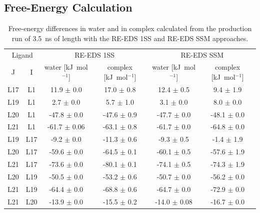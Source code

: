 \subsection{Free-Energy Calculation}
\begin{table}[H]
\caption{Free-energy differences in water and in complex calculated from the production run of 3.5~ns of length with the RE-EDS 1SS and RE-EDS SSM approaches.}
\begin{center}
\begin{tabular}{ c c |c c |c c}
  \multicolumn{2}{c|}{Ligand} & \multicolumn{2}{c|}{RE-EDS 1SS} &\multicolumn{2}{c}{RE-EDS SSM}\\ 
  J & I  & water [kJ~mol$^{-1}$] & complex [kJ~mol$^{-1}$]  & water [kJ~mol$^{-1}$] & complex [kJ~mol$^{-1}$] \\
  \hline
        L17 &         L1 &       11.9 $\pm$ 0.0&        17.0 $\pm$ 0.8&   12.4 $\pm$ 0.5&   9.4 $\pm$ 1.9\\
        L19 &         L1 &        2.7 $\pm$ 0.0&        5.7 $\pm$ 1.0&     3.1 $\pm$ 0.0&   8.0 $\pm$ 0.0\\
        L20 &         L1 &      -47.8 $\pm$ 0.0&      -47.6 $\pm$ 0.9& -47.7 $\pm$ 0.0&  -48.1 $\pm$ 0.0\\
        L21 &         L1 &      -61.7 $\pm$ 0.06&     -63.1 $\pm$ 0.8& -61.7 $\pm$ 0.0&  -64.8 $\pm$ 0.0\\
        L19 &         L17 &      -9.2 $\pm$ 0.0&      -11.3 $\pm$ 0.6&  -9.3 $\pm$ 0.5&   -1.4 $\pm$ 1.9\\
        L20 &         L17 &     -59.6 $\pm$ 0.0&      -64.5 $\pm$ 0.1& -60.1 $\pm$ 0.5&  -57.6 $\pm$ 1.9\\
        L21 &         L17 &     -73.6 $\pm$ 0.0&      -80.1 $\pm$ 0.1& -74.1 $\pm$ 0.5&  -74.3 $\pm$ 1.9\\
        L20 &         L19 &     -50.5 $\pm$ 0.0&      -53.2 $\pm$ 0.6& -50.7 $\pm$ 0.0&  -56.2 $\pm$ 0.0\\
        L21 &         L19 &     -64.4 $\pm$ 0.0&      -68.8 $\pm$ 0.6& -64.7 $\pm$ 0.0&  -72.9 $\pm$ 0.0\\
        L21 &         L20 &     -13.9 $\pm$ 0.0&      -15.5 $\pm$ 0.2& -14.0 $\pm$ 0.08& -16.7 $\pm$ 0.0 \\
\end{tabular}
\end{center}
\label{SItab: RE-EDS_FE_RingCycleOpening_dFs}
\end{table}

